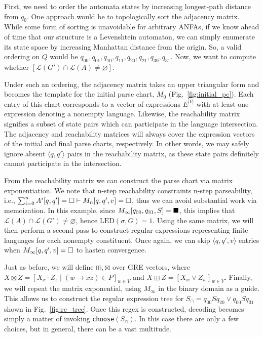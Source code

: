 \documentclass[sigplan,review,acmsmall,nonacm,screen,anonymous]{acmart}\settopmatter{printfolios=false,printccs=false,printacmref=false}
\begin{document}
First, we need to order the automata states by increasing longest-path distance from $q_0$. One approach would be to topologically sort the adjacency matrix. While some form of sorting is unavoidable for arbitrary ANFAs, if we know ahead of time that our structure is a Levenshtein automaton, we can simply enumerate its state space by increasing Manhattan distance from the origin. %
So, a valid ordering on $Q$ would be $q_{00}, q_{01}, q_{10}, q_{11}, q_{20}, q_{21}, q_{30}, q_{31}$. Now, we want to compute whether $[\mathcal{L}(G')\cap \mathcal{L}(A) \neq \varnothing]$.

Under such an ordering, the adjacency matrix takes an upper triangular form and becomes the template for the initial parse chart, $M_0$ (Fig.~\ref{fig:initial_pc}). Each entry of this chart corresponds to a vector of expressions $E^{|V|}$ with at least one expression denoting a nonempty language. Likewise, the reachability matrix signifies a subset of state pairs which can participate in the language intersection. The adjacency and reachability matrices will always cover the expression vectors of the initial and final parse charts, respectively. In other words, we may safely ignore absent $\langle q, q'\rangle$ pairs in the reachability matrix, as these state pairs definitely cannot participate in the intersection.

From the reachability matrix we can construct the parse chart via matrix exponentiation. We note that n-step reachability constraints n-step parseability, i.e., $\sum_{i=0}^n A^i[q, q'] = \square \vdash M_n[q, q', v] = \square$, thus we can avoid substantial work via memoization. In this example, since $M_\infty[q_{00}, q_{31}, S] = \blacksquare$, this implies that $\mathcal{L}(A)\cap \mathcal{L}(G') \neq \varnothing$, hence $\text{LED}(\sigma, G) = 1$. Using the same matrix, we will then perform a second pass to construct regular expressions representing finite languages for each nonempty constituent. Once again, we can skip $\langle q, q', v\rangle$ entries when $M_\infty[q, q', v] = \square$ to hasten convergence.

\enlargethispage{4\baselineskip}
Just as before, we will define $\boxplus, \boxtimes$ over GRE vectors, where $X \boxtimes Z = [X_x\cdot Z_z \mid (w\rightarrow xz) \in P]_{w\in V}$ and $X \boxplus Z= [ X_w\vee Z_w ]_{w\in V}$. Finally, we will repeat the matrix exponential, using $M_\infty$ in the binary domain as a guide. This allows us to construct the regular expression tree for $S_\cap = q_{00}Sq_{20}\vee q_{00}Sq_{31}$ shown in Fig.~\ref{fig:re_tree}. Once this regex is constructed, decoding becomes simply a matter of invoking \texttt{choose}$(S_\cap)$. In this case there are only a few choices, but in general, there can be a vast multitude.
\end{document}
